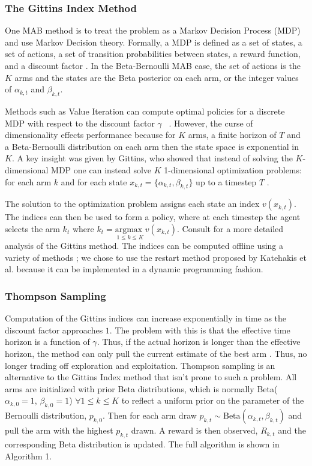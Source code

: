 \documentclass[10pt, conference]{ieeeconf}      %
\begin{document}
\subsubsection{The Gittins Index Method} 
One MAB method is to treat the problem as a Markov Decision Process (MDP) and use Markov Decision theory.
Formally, a MDP is defined as a set of states, a set of actions, a set of transition probabilities between states, a reward function, and a discount factor \cite{barto1998reinforcement}.
In the Beta-Bernoulli MAB case, the set of actions is the $K$ arms and the states are the Beta posterior on each arm, or the integer values of $\alpha_{k,t}$ and $\beta_{k,t}$. 

Methods such as Value Iteration can compute optimal policies for a discrete MDP with respect to the discount factor $\gamma$ ~\cite{barto1998reinforcement}.
However, the curse of dimensionality effects performance because for $K$ arms, a finite horizon of $T$ and a Beta-Bernoulli distribution on each arm then the state space is exponential in $K$.
A key insight was given by Gittins, who showed that instead of solving the $K$-dimensional MDP one can instead solve $K$ 1-dimensional optimization problems: for each arm $k$ and for each state $x_{k,t} = \lbrace \alpha_{k,t}, \beta_{k,t} \rbrace$ up to a timestep $T$ \cite{weber1992gittins}.

The solution to the optimization problem assigns each state an index $v(x_{k,t})$.
The indices can then be used to form a policy, where at each timestep the agent selects the arm $k_t$ where $k_t= \underset{1 \leq k \leq K}{\mbox{argmax }} v(x_{k,t})$.  Consult \cite{gittins2011multi} for a more detailed analysis of the Gittins method. The indices can be  computed offline using a variety of methods \cite{weber1992gittins}; we chose to use the restart method proposed by Katehakis et al. \cite{katehakis1987multi} because it can be implemented in a dynamic programming fashion. 
 

\subsubsection{Thompson Sampling}
Computation of the Gittins indices can increase exponentially in time as the discount factor approaches $1$. The problem with this is that the effective time horizon is a function of $\gamma$. Thus, if the actual horizon is longer than the effective horizon, the method can only pull the current estimate of the best arm \cite{kelly1981multi}. Thus, no longer trading off exploration and exploitation. Thompson sampling is an alternative to the Gittins Index method that isn't prone to such a problem. 
All arms are initialized with prior Beta distributions, which is normally Beta($\alpha_{k,0}=1$,  $\beta_{k,0} =1$) $\forall 1 \leq k \leq K$ to reflect a uniform prior on the parameter of the Bernoulli distribution, $p_{k,0}$.
Then for each arm draw $p_{k,t} \sim \mbox{Beta}(\alpha_{k,t},\beta_{k,t})$ and pull the arm with the highest $p_{k,t}$ drawn.
A reward is then observed, $R_{k,t}$ and the corresponding Beta distribution is updated. The full algorithm is shown in Algorithm 1.  
\end{document}
